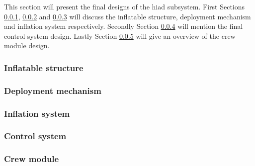 %
This section will present the final designs of the \gls{hiad} subsystem. First Sections \ref{subsec:infldes}, \ref{subsec:depldes} and \ref{subsec:inflsys} will discuss the inflatable structure, deployment mechanism and inflation system respectively. Secondly Section \ref{subsec:controlsys} will mention the final control system design. Lastly Section \ref{subsec:crewmod} will give an overview of the crew module design.
\subsubsection{Inflatable structure}\label{subsec:infldes}


%

\subsubsection{Deployment mechanism}\label{subsec:depldes}


\subsubsection{Inflation system}\label{subsec:inflsys}


\subsubsection{Control system}\label{subsec:controlsys}


\subsubsection{Crew module}\label{subsec:crewmod}


